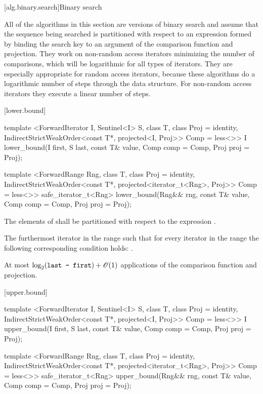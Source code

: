 [alg.binary.search]{Binary search}

\pnum
All of the algorithms in this section are versions of binary search
and assume that the sequence being searched is partitioned with respect to
an expression formed by binding the search key to an argument of the
comparison function and projection.
They work on non-random access iterators minimizing the number of comparisons,
which will be logarithmic for all types of iterators.
They are especially appropriate for random access iterators,
because these algorithms do a logarithmic number of steps
through the data structure.
For non-random access iterators they execute a linear number of steps.

[lower.bound]{}

%
\begin{itemdecl}
template <ForwardIterator I, Sentinel<I> S, class T, class Proj = identity,
    IndirectStrictWeakOrder<const T*, projected<I, Proj>> Comp = less<>>
  I
    lower_bound(I first, S last, const T& value, Comp comp = Comp{},
                Proj proj = Proj{});

template <ForwardRange Rng, class T, class Proj = identity,
    IndirectStrictWeakOrder<const T*, projected<iterator_t<Rng>, Proj>> Comp = less<>>
  safe_iterator_t<Rng>
    lower_bound(Rng&& rng, const T& value, Comp comp = Comp{}, Proj proj = Proj{});
\end{itemdecl}

\begin{itemdescr}
\pnum
\requires
The elements
of
shall be partitioned with respect to the expression
.

\pnum
\returns
The furthermost iterator
in the range
such that for every iterator
in the range
the following corresponding condition holds:
.

\pnum
\complexity
At most
$\log_2(\texttt{last - first}) + \mathscr{O}(1)$
applications of the comparison function and projection.
\end{itemdescr}

[upper.bound]{}

%
\begin{itemdecl}
template <ForwardIterator I, Sentinel<I> S, class T, class Proj = identity,
    IndirectStrictWeakOrder<const T*, projected<I, Proj>> Comp = less<>>
  I
    upper_bound(I first, S last, const T& value, Comp comp = Comp{}, Proj proj = Proj{});

template <ForwardRange Rng, class T, class Proj = identity,
    IndirectStrictWeakOrder<const T*, projected<iterator_t<Rng>, Proj>> Comp = less<>>
  safe_iterator_t<Rng>
    upper_bound(Rng&& rng, const T& value, Comp comp = Comp{}, Proj proj = Proj{});
\end{itemdecl}

